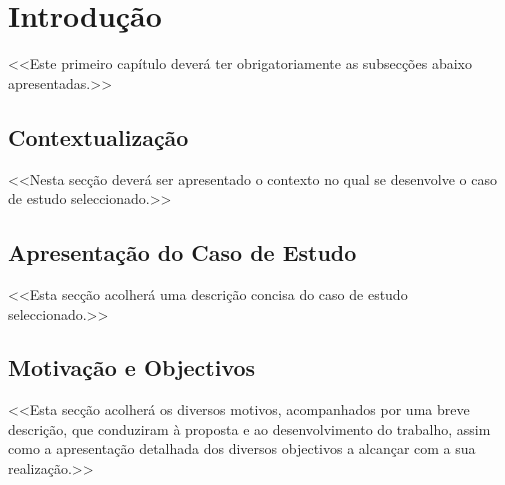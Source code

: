 \documentclass[a4paper,12pt]{scrreprt}
\begin{document}
\pagebreak



\renewcommand{\contentsname}{Índice}

\tableofcontents

\pagebreak

\listoffigures

\pagebreak

\listoftables

\pagebreak





\chapter{Introdução}
    <<Este primeiro capítulo deverá ter obrigatoriamente as subsecções abaixo apresentadas.>>
    \section{Contextualização}
        <<Nesta secção deverá ser apresentado o contexto no qual se desenvolve o caso de estudo seleccionado.>>
    \section{Apresentação do Caso de Estudo}
        <<Esta secção acolherá uma descrição concisa do caso de estudo seleccionado.>>
    \section{Motivação e Objectivos}
        <<Esta secção acolherá os diversos motivos, acompanhados por uma breve descrição, que conduziram à proposta e ao desenvolvimento do trabalho, assim como a apresentação detalhada dos diversos objectivos a alcançar com a sua realização.>>
\end{document}
